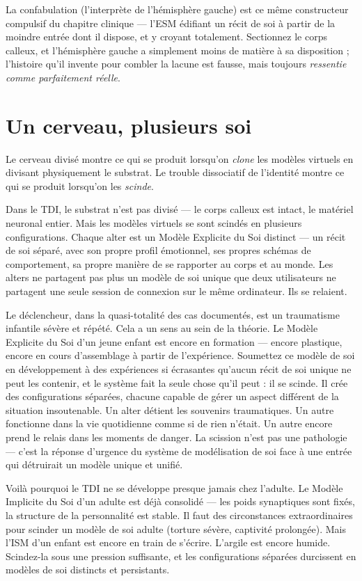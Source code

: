 \documentclass[11pt, twoside, openright]{book}
\begin{document}
La confabulation (l'interprète de l'hémisphère gauche) est ce même constructeur compulsif du chapitre clinique --- l'ESM édifiant un récit de soi à partir de la moindre entrée dont il dispose, et y croyant totalement. Sectionnez le corps calleux, et l'hémisphère gauche a simplement moins de matière à sa disposition ; l'histoire qu'il invente pour combler la lacune est fausse, mais toujours \textit{ressentie comme parfaitement réelle}.

\section*{Un cerveau, plusieurs soi}

Le cerveau divisé montre ce qui se produit lorsqu'on \textit{clone} les modèles virtuels en divisant physiquement le substrat. Le trouble dissociatif de l'identité montre ce qui se produit lorsqu'on les \textit{scinde}.

Dans le TDI, le substrat n'est pas divisé --- le corps calleux est intact, le matériel neuronal entier. Mais les modèles virtuels se sont scindés en plusieurs configurations. Chaque alter est un Modèle Explicite du Soi distinct --- un récit de soi séparé, avec son propre profil émotionnel, ses propres schémas de comportement, sa propre manière de se rapporter au corps et au monde. Les alters ne partagent pas plus un modèle de soi unique que deux utilisateurs ne partagent une seule session de connexion sur le même ordinateur. Ils se relaient.

Le déclencheur, dans la quasi-totalité des cas documentés, est un traumatisme infantile sévère et répété. Cela a un sens au sein de la théorie. Le Modèle Explicite du Soi d'un jeune enfant est encore en formation --- encore plastique, encore en cours d'assemblage à partir de l'expérience. Soumettez ce modèle de soi en développement à des expériences si écrasantes qu'aucun récit de soi unique ne peut les contenir, et le système fait la seule chose qu'il peut : il se scinde. Il crée des configurations séparées, chacune capable de gérer un aspect différent de la situation insoutenable. Un alter détient les souvenirs traumatiques. Un autre fonctionne dans la vie quotidienne comme si de rien n'était. Un autre encore prend le relais dans les moments de danger. La scission n'est pas une pathologie --- c'est la réponse d'urgence du système de modélisation de soi face à une entrée qui détruirait un modèle unique et unifié.

Voilà pourquoi le TDI ne se développe presque jamais chez l'adulte. Le Modèle Implicite du Soi d'un adulte est déjà consolidé --- les poids synaptiques sont fixés, la structure de la personnalité est stable. Il faut des circonstances extraordinaires pour scinder un modèle de soi adulte (torture sévère, captivité prolongée). Mais l'ISM d'un enfant est encore en train de s'écrire. L'argile est encore humide. Scindez-la sous une pression suffisante, et les configurations séparées durcissent en modèles de soi distincts et persistants.
\end{document}

